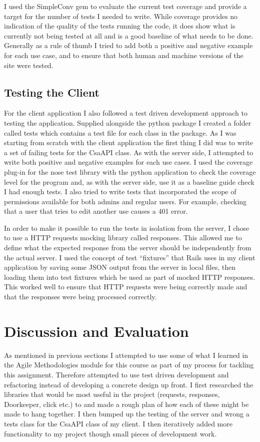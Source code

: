 \documentclass[paper=a4, fontsize=11pt]{scrartcl}	%
\numberwithin{equation}{section}															%
\numberwithin{figure}{section}																%
\numberwithin{table}{section}
\begin{document}
I used the SimpleConv gem to evaluate the current test coverage and provide a target for the number of tests I needed to write. While coverage provides no indication of the quality of the tests running the code, it does show what is currently not being tested at all and is a good baseline of what needs to be done. Generally as a rule of thumb I tried to add both a positive and negative example for each use case, and to ensure that both human and machine versions of the site were tested.

\subsection{Testing the Client}
\label{subsec:client-testing}
For the client application I also followed a test driven development approach to testing the application. Supplied alongside the python package I created a folder called tests which contains a test file for each class in the package. As I was starting from scratch with the client application the first thing I did was to write a set of failing tests for the CsaAPI class. As with the server side, I attempted to write both positive and negative examples for each use cases. I used the coverage plug-in for the nose test library with the python application to check the coverage level for the program and, as with the server side, use it as a baseline guide check I had enough tests. I also tried to write tests that incorporated the scope of permissions available for both admins and regular users. For example, checking that a user that tries to edit another use causes a 401 error. 

In order to make it possible to run the tests in isolation from the server, I chose to use a HTTP requests mocking library called responses. This allowed me to define what the expected response from the server should be independently from the actual server. I used the concept of test ``fixtures'' that Rails uses in my client application by saving some JSON output from the server in local files, then loading them into test fixtures which be used as part of mocked HTTP responses. This worked well to ensure that HTTP requests were being correctly made and that the responses were being processed correctly.

\section{Discussion and Evaluation}
\label{sec:evaluation}
As mentioned in previous sections I attempted to use some of what I learned in the Agile Methodologies module for this course as part of my process for tackling this assignment. Therefore attempted to use test driven development and refactoring instead of developing a concrete design up front. I first researched the libraries that would be most useful in the project (requests, responses, Doorkeeper, click etc.) to and made a rough plan of how each of these might be made to hang together. I then bumped up the testing of the server and wrong a tests class for the CsaAPI class of my client. I then iteratively added more functionality to my project though small pieces of development work.
\end{document}
